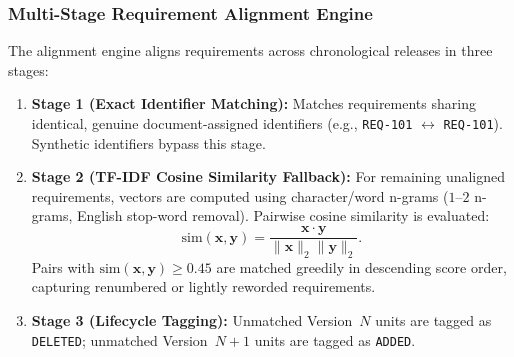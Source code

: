 \documentclass[journal]{IEEEtran}
\begin{document}
\subsubsection{Multi-Stage Requirement Alignment Engine}
\label{sec:alignment}
The alignment engine aligns requirements across chronological releases in three stages:
\begin{enumerate}
    \item \textbf{Stage 1 (Exact Identifier Matching):} Matches requirements sharing identical, genuine document-assigned identifiers (e.g., \texttt{REQ-101} $\leftrightarrow$ \texttt{REQ-101}). Synthetic identifiers bypass this stage.
    \item \textbf{Stage 2 (TF-IDF Cosine Similarity Fallback):} For remaining unaligned requirements, vectors are computed using character/word n-grams ($1$--$2$ n-grams, English stop-word removal). Pairwise cosine similarity is evaluated:
    \begin{equation}
    \text{sim}(\mathbf{x}, \mathbf{y}) = \frac{\mathbf{x} \cdot \mathbf{y}}{\|\mathbf{x}\|_2 \|\mathbf{y}\|_2}.
    \label{eq:cosine}
    \end{equation}
    Pairs with $\text{sim}(\mathbf{x}, \mathbf{y}) \ge 0.45$ are matched greedily in descending score order, capturing renumbered or lightly reworded requirements.
    \item \textbf{Stage 3 (Lifecycle Tagging):} Unmatched Version~$N$ units are tagged as \texttt{DELETED}; unmatched Version~$N+1$ units are tagged as \texttt{ADDED}.
\end{enumerate}
\end{document}
